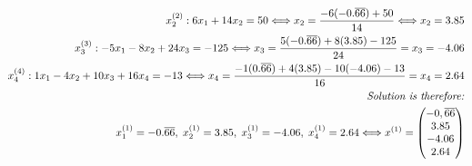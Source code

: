 \documentclass{beamer}
\begin{document}
{\begin{align*}
			x_2^{(2)}:6x_1+14x_2=50 \Longleftrightarrow x_2=\frac{-6(-0.\overline{66})+50}{14} \Longleftrightarrow x_2=3.85 \\ 
			x_3^{(3)}:-5x_1-8x_2+24x_3=-125 \Longleftrightarrow x_3=\frac{5(-0.\overline{66})+8(3.85)-125}{24}=x_3=-4.06 \\
			x_4^{(4)}:1x_1-4x_2+10x_3+16x_4=-13 \Longleftrightarrow x_4=\frac{-1(0.\overline{66})+4(3.85)-10(-4.06)-13}{16}=x_4=2.64 \\
			\text{\emph{Solution is therefore:}} \\
			x_1^{(1)}=-0.\overline{66},\;x_2^{(1)}=3.85,\;x_3^{(1)}=-4.06,\;x_4^{(1)}=2.64 \Longleftrightarrow x^{(1)}=\begin{pmatrix}-0,\overline{66} \\3.85 \\-4.06 \\2.64\end{pmatrix}
		\end{align*}
	}
\end{document}
